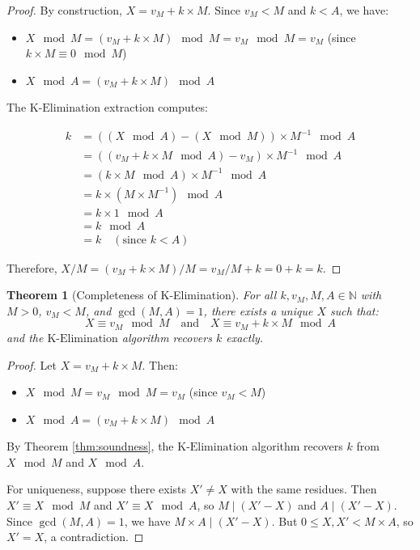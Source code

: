\documentclass[11pt,letterpaper]{article}
\newtheorem{theorem}{Theorem}[section]
\newcommand{\N}{\mathbb{N}}
\newcommand{\KElim}{\text{K-Elimination}}
\begin{document}
\begin{proof}
By construction, \(X = v_M + k \times M\). Since \(v_M < M\) and \(k < A\), we have:

\begin{itemize}
\item \(X \mod M = (v_M + k \times M) \mod M = v_M\mod M = v_M\) (since \(k \times M \equiv 0 \mod M\))
\item \(X \mod A = (v_M + k \times M) \mod A\)
\end{itemize}

The \(\KElim\) extraction computes:

\begin{equation*}\begin{aligned}
k &= \left( (X \mod A) - (X \mod M) \right) \times M^{-1} \mod A \\
&= \left( (v_M + k \times M \mod A) - v_M \right) \times M^{-1} \mod A \\
&= \left( k \times M \mod A \right) \times M^{-1} \mod A \\
&= k \times (M \times M^{-1}) \mod A \\
&= k \times 1 \mod A \\
&= k \mod A \\
&= k \quad (\text{since } k < A)
\end{aligned}\end{equation*}

Therefore, \(X / M = (v_M + k \times M) / M = v_M/M + k = 0 + k = k\).
\end{proof}

\begin{theorem}[Completeness of K-Elimination]
\label{thm:completeness}
For all \(k, v_M, M, A \in \N\) with \(M > 0\), \(v_M < M\), and \(\gcd(M, A) = 1\), there exists a unique \(X\) such that:
\begin{equation*}
X \equiv v_M \mod M \quad \text{and} \quad X \equiv v_M + k \times M \mod A
\end{equation*}
and the \(\KElim\) algorithm recovers \(k\) exactly.
\end{theorem}

\begin{proof}
Let \(X = v_M + k \times M\). Then:

\begin{itemize}
\item \(X \mod M = v_M\mod M = v_M\) (since \(v_M < M\))
\item \(X \mod A = (v_M + k \times M) \mod A\)
\end{itemize}

By Theorem \ref{thm:soundness}, the \(\KElim\) algorithm recovers \(k\) from \(X \mod M\) and \(X \mod A\).

For uniqueness, suppose there exists \(X'\neq X\) with the same residues. Then \(X' \equiv X \mod M\) and \(X' \equiv X \mod A\), so \(M \mid (X' - X)\) and \(A \mid (X' - X)\). Since \(\gcd(M, A) = 1\), we have \(M \times A \mid (X' - X)\). But \(0 \leq X, X' < M \times A\), so \(X' = X\), a contradiction.
\end{proof}
\end{document}
